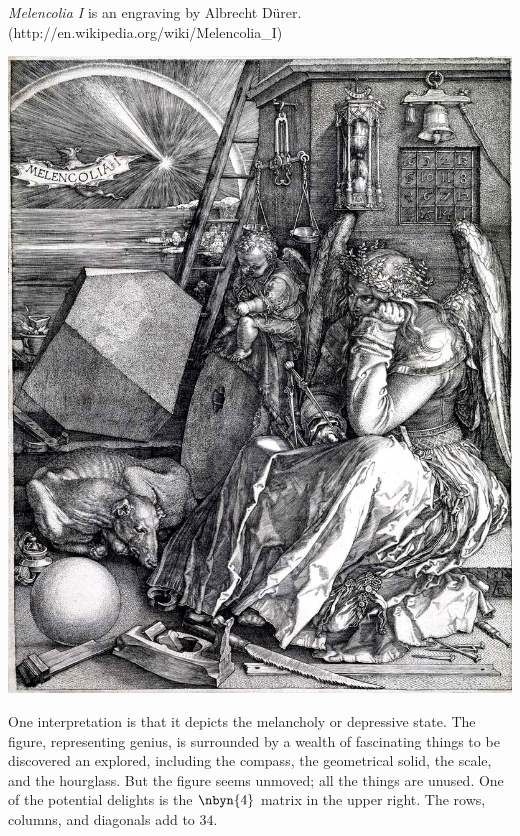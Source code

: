 \textit{Melencolia I} is an engraving by Albrecht D\"urer.
(http://en.wikipedia.org/wiki/Melencolia_I)
\begin{center}
  \includegraphics{Melencolia.jpg} %
\end{center}
One interpretation is that it depicts the melancholy or depressive state.
The figure, representing genius,
is surrounded by a wealth of fascinating things to be discovered an explored, 
including
the compass, the geometrical solid, the scale, and the hourglass.
But the figure seems unmoved; all the things are unused.
One of the potential delights is the $\nbyn{4}$ matrix in the upper right.
The rows, columns, and diagonals add to $34$.
